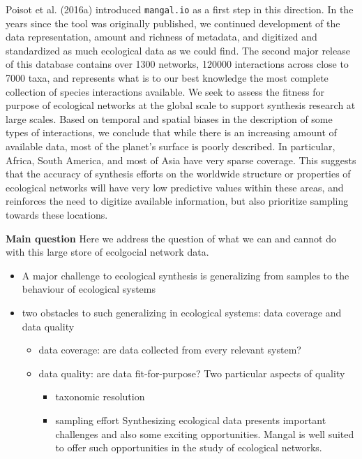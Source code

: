 Poisot et al. (2016a) introduced \texttt{mangal.io} as a first step in
this direction. In the years since the tool was originally published, we
continued development of the data representation, amount and richness of
metadata, and digitized and standardized as much ecological data as we
could find. The second major release of this database contains over 1300
networks, 120000 interactions across close to 7000 taxa, and represents
what is to our best knowledge the most complete collection of species
interactions available. We seek to assess the fitness for purpose of
ecological networks at the global scale to support synthesis research at
large scales. Based on temporal and spatial biases in the description of
some types of interactions, we conclude that while there is an
increasing amount of available data, most of the planet's surface is
poorly described. In particular, Africa, South America, and most of Asia
have very sparse coverage. This suggests that the accuracy of synthesis
efforts on the worldwide structure or properties of ecological networks
will have very low predictive values within these areas, and reinforces
the need to digitize available information, but also prioritize sampling
towards these locations.

\textbf{Main question} Here we address the question of what we can and
cannot do with this large store of ecolgocial network data.

\begin{itemize}
\tightlist
\item
  A major challenge to ecological synthesis is generalizing from samples
  to the behaviour of ecological systems
\item
  two obstacles to such generalizing in ecological systems: data
  coverage and data quality

  \begin{itemize}
  \tightlist
  \item
    data coverage: are data collected from every relevant system?
  \item
    data quality: are data fit-for-purpose? Two particular aspects of
    quality

    \begin{itemize}
    \tightlist
    \item
      taxonomic resolution
    \item
      sampling effort Synthesizing ecological data presents important
      challenges and also some exciting opportunities. Mangal is well
      suited to offer such opportunities in the study of ecological
      networks.
    \end{itemize}
  \end{itemize}
\end{itemize}

